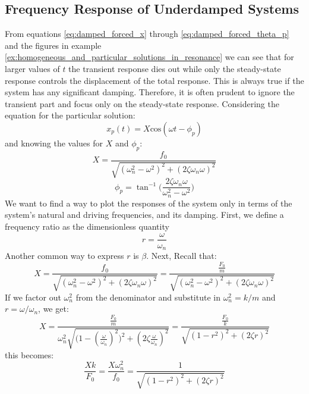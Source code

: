 \documentclass[12pt,letter]{article}
\numberwithin{ex}{section} %
\numberwithin{re}{section} %
\numberwithin{vcs}{section} %
\begin{document}
		\subsection{Frequency Response of Underdamped Systems}						
			From equations \ref{eq:damped_forced_x} through \ref{eq:damped_forced_theta_p} and the figures in example \ref{ex:homogeneous_and_particular_solutions_in_resonance} we can see that for larger values of $t$ the transient response dies out while only the steady-state response controls the displacement of the total response. This is always true if the system has any significant damping. Therefore, it is often prudent to ignore the transient part and focus only on the steady-state response. Considering the equation for the particular solution: 
			\begin{equation}
				x_p(t) = X \text{cos}(\omega t - \phi_p)
			\end{equation}			 
			and knowing the values for $X$ and $\phi_p$: 
			\begin{equation}
				X = \frac{f_0}{\sqrt{(\omega_n^2 - \omega^2)^2 +  (2\zeta \omega_n \omega)^2}} 
			\end{equation}	
			\begin{equation}
				\phi_p = \tan^{-1} \bigg(\frac{2\zeta \omega_n \omega}{\omega_n^2 - \omega^2}\bigg)
			\end{equation}	
			We want to find a way to plot the responses of the system only in terms of the system's natural and driving frequencies, and its damping. First, we define a frequency ratio as the dimensionless quantity 
			\begin{equation}
				r = \frac{\omega}{\omega_n}
			\end{equation}
			Another common way to express $r$ is $\beta$. Next, Recall that:
			\begin{equation}
				X = \frac{f_0}{\sqrt{(\omega_n^2 - \omega^2)^2 +  (2\zeta \omega_n \omega)^2}}  = \frac{\frac{F_0}{m}}{\sqrt{(\omega_n^2 - \omega^2)^2 +  (2\zeta \omega_n \omega)^2}} 
			\end{equation}				
			If we factor out $\omega_n^2$ from the denominator and substitute in $\omega_n^2 = k/m$ and $r = \omega/\omega_n$, we get:
			\begin{equation}
				X = \frac{\frac{F_0}{m}}{\omega_n^2 \sqrt{\big(1 - (\frac{\omega}{\omega_n})^2\big)^2 +  (2\zeta \frac{\omega}{\omega_n})^2}} =  \frac{\frac{F_0}{k}}{\sqrt{(1-r^2)^2+(2\zeta r)^2}}
			\end{equation}				
			this becomes:
			\begin{equation}
				\frac{Xk}{F_0} = \frac{X \omega_n^2}{f_0} = \frac{1}{\sqrt{(1-r^2)^2+(2\zeta r)^2}}
			\end{equation}				
\end{document}
